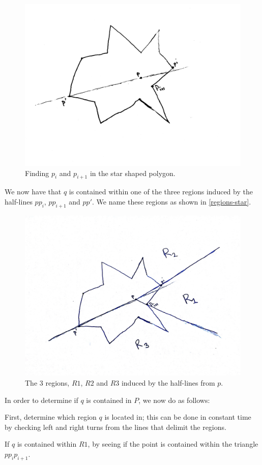 \documentclass[11pt,a4paper]{article}
\begin{document}
\begin{figure}[h!]
    \centering
    \includegraphics[width=.7\textwidth]{regionsstar1.jpg}
    \caption{Finding $p_i$ and $p_{i+1}$ in the star shaped polygon.}
\end{figure}

We now have that $q$ is contained within one of the three regions induced
by the half-lines $p p_i$, $p p_{i+1}$ and $p p'$. We name these regions
as shown in \autoref{regions-star}.

\begin{figure}[h!]
    \centering
    \includegraphics[width=.7\textwidth]{regionsstar2.jpg}
    \caption{The 3 regions, $R1$, $R2$ and $R3$ induced by the half-lines
    from $p$.}
    \label{regions-star}
\end{figure}

In order to determine if $q$ is contained in $P$, we now do as follows:

First, determine which region $q$ is located in; this can be done in constant
time by checking left and right turns from the lines that delimit the
regions.

If $q$ is contained within $R1$, by seeing if the point is
contained within the triangle $p p_i p_{i+1}$.
\end{document}
